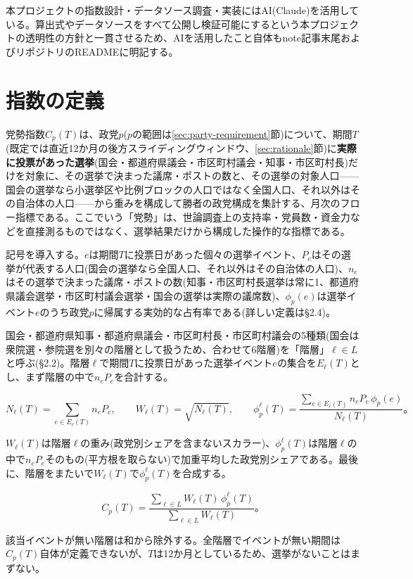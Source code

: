 \documentclass[a4paper,11pt]{ltjsarticle}
\begin{document}
本プロジェクトの指数設計・データソース調査・実装にはAI(Claude)を活用している。算出式やデータソースをすべて公開し検証可能にするという本プロジェクトの透明性の方針と一貫させるため、AIを活用したこと自体もnote記事末尾およびリポジトリのREADMEに明記する。

\section{指数の定義}

党勢指数$C_p(T)$は、政党$p$($p$の範囲は\ref{sec:party-requirement}節)について、期間$T$(既定では直近12か月の後方スライディングウィンドウ、\ref{sec:rationale}節)に\textbf{実際に投票があった選挙}(国会・都道府県議会・市区町村議会・知事・市区町村長)だけを対象に、その選挙で決まった議席・ポストの数と、その選挙の対象人口——国会の選挙なら小選挙区や比例ブロックの人口ではなく全国人口、それ以外はその自治体の人口——から重みを構成して勝者の政党構成を集計する、月次のフロー指標である。ここでいう「党勢」は、世論調査上の支持率・党員数・資金力などを直接測るものではなく、選挙結果だけから構成した操作的な指標である。

記号を導入する。$e$は期間$T$に投票日があった個々の選挙イベント、$P_e$はその選挙が代表する人口(国会の選挙なら全国人口、それ以外はその自治体の人口)、$n_e$はその選挙で決まった議席・ポストの数(知事・市区町村長選挙は常に1、都道府県議会選挙・市区町村議会選挙・国会の選挙は実際の議席数)、$\phi_p(e)$は選挙イベント$e$のうち政党$p$に帰属する実効的な占有率である(詳しい定義は\S2.4)。

国会・都道府県知事・都道府県議会・市区町村長・市区町村議会の5種類(国会は衆院選・参院選を別々の階層として扱うため、合わせて6階層)を「階層」$\ell\in L$と呼ぶ(\S2.2)。階層$\ell$で期間$T$に投票日があった選挙イベント$e$の集合を$E_\ell(T)$とし、まず階層の中で$n_eP_e$を合計する。

\[
N_\ell(T) = \sum_{e\in E_\ell(T)} n_eP_e, \qquad
W_\ell(T) = \sqrt{N_\ell(T)}, \qquad
\phi_p^\ell(T) = \frac{\displaystyle\sum_{e\in E_\ell(T)} n_eP_e\,\phi_p(e)}{N_\ell(T)}。
\]

$W_\ell(T)$は階層$\ell$の重み(政党別シェアを含まないスカラー)、$\phi_p^\ell(T)$は階層$\ell$の中で$n_eP_e$そのもの(平方根を取らない)で加重平均した政党別シェアである。最後に、階層をまたいで$W_\ell(T)$で$\phi_p^\ell(T)$を合成する。

\[
C_p(T) = \frac{\displaystyle\sum_{\ell\in L} W_\ell(T)\,\phi_p^\ell(T)}
               {\displaystyle\sum_{\ell\in L} W_\ell(T)}。
\]

該当イベントが無い階層は和から除外する。全階層でイベントが無い期間は$C_p(T)$自体が定義できないが、$T$は12か月としているため、選挙がないことはまずない。
\end{document}
